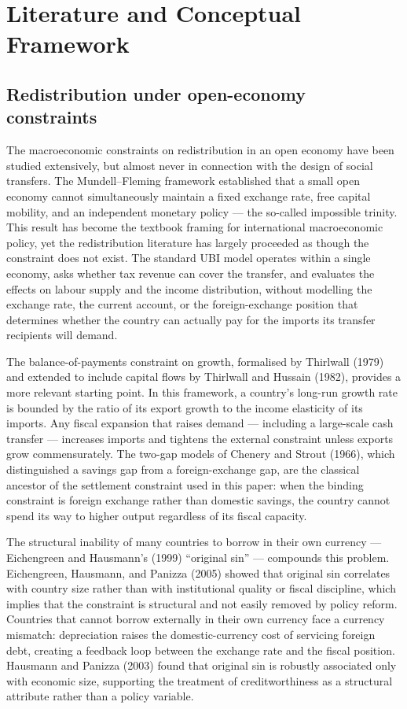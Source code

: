 \documentclass[preprint,review,12pt]{elsarticle}
\begin{document}
\section{Literature and Conceptual Framework}

\subsection{Redistribution under open-economy constraints}

The macroeconomic constraints on redistribution in an open economy have
been studied extensively, but almost never in connection with the design
of social transfers. The Mundell--Fleming framework established that a
small open economy cannot simultaneously maintain a fixed exchange rate,
free capital mobility, and an independent monetary policy --- the
so-called impossible trinity. This result has become the textbook
framing for international macroeconomic policy, yet the redistribution
literature has largely proceeded as though the constraint does not
exist. The standard UBI model operates within a single economy, asks
whether tax revenue can cover the transfer, and evaluates the effects on
labour supply and the income distribution, without modelling the
exchange rate, the current account, or the foreign-exchange position
that determines whether the country can actually pay for the imports its
transfer recipients will demand.

The balance-of-payments constraint on growth, formalised by Thirlwall
(1979) and extended to include capital flows by Thirlwall and Hussain
(1982), provides a more relevant starting point. In this framework, a
country's long-run growth rate is bounded by the ratio of its export
growth to the income elasticity of its imports. Any fiscal expansion
that raises demand --- including a large-scale cash transfer ---
increases imports and tightens the external constraint unless exports
grow commensurately. The two-gap models of Chenery and Strout (1966),
which distinguished a savings gap from a foreign-exchange gap, are the
classical ancestor of the settlement constraint used in this paper: when
the binding constraint is foreign exchange rather than domestic savings,
the country cannot spend its way to higher output regardless of its
fiscal capacity.

The structural inability of many countries to borrow in their own
currency --- Eichengreen and Hausmann's (1999) ``original sin'' ---
compounds this problem. Eichengreen, Hausmann, and Panizza (2005) showed
that original sin correlates with country size rather than with
institutional quality or fiscal discipline, which implies that the
constraint is structural and not easily removed by policy reform.
Countries that cannot borrow externally in their own currency face a
currency mismatch: depreciation raises the domestic-currency cost of
servicing foreign debt, creating a feedback loop between the exchange
rate and the fiscal position. Hausmann and Panizza (2003) found that
original sin is robustly associated only with economic size, supporting
the treatment of creditworthiness as a structural attribute rather than
a policy variable.
\end{document}
